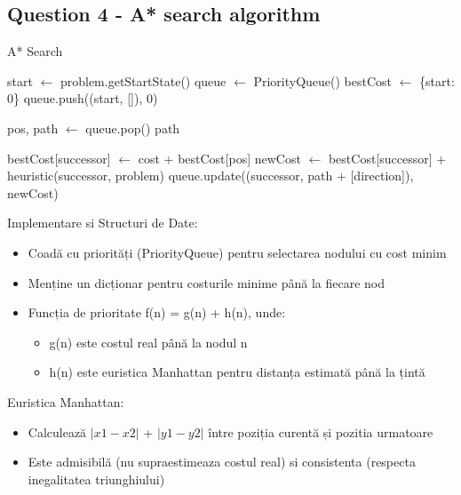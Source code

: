 \subsection{Question 4 - A* search  algorithm}
\begin{algorithm}
\caption{A* Search}
\begin{algorithmic}[1]
    \State start $\gets$ problem.getStartState()
    \State queue $\gets$ PriorityQueue()
    \State bestCost $\gets$ \{start: 0\}
    \State queue.push((start, []), 0)
    
        \State pos, path $\gets$ queue.pop()
            \Return path
        \EndIf
        
                \State bestCost[successor] $\gets$ cost + bestCost[pos]
                \State newCost $\gets$ bestCost[successor] + heuristic(successor, problem)
                \State queue.update((successor, path + [direction]), newCost)
            \EndIf
        \EndFor
    \EndWhile \\
	\Return [ ]
\EndFunction
\end{algorithmic}
\end{algorithm}

\par Implementare si Structuri de Date:
\begin {itemize}
	\item Coadă cu priorități (PriorityQueue) pentru selectarea nodului cu cost minim
	\item Menține un dicționar pentru costurile minime până la fiecare nod
	\item Funcția de prioritate f(n) = g(n) + h(n), unde:
	\begin {itemize}
		\item g(n) este costul real până la nodul n
		\item h(n) este euristica Manhattan pentru distanța estimată până la țintă
	\end {itemize}
\end {itemize} 

\par Euristica Manhattan:

\begin {itemize}
	\item Calculează $|x1-x2|$ + $|y1-y2|$ între poziția curentă și pozitia urmatoare
	\item Este admisibilă (nu supraestimeaza costul real) si consistenta (respecta inegalitatea triunghiului)
\end {itemize}

